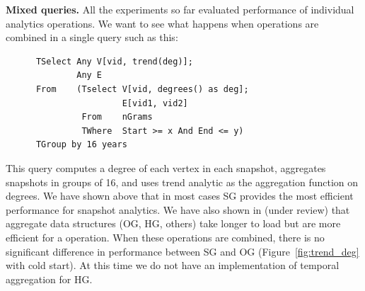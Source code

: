 
{\bf Mixed queries.} All the experiments so far evaluated performance
of individual \ql analytics operations.  We want to see what happens
when operations are combined in a single query such as this:

\begin{small}
\begin{verbatim}
      TSelect Any V[vid, trend(deg)];
              Any E
      From    (Tselect V[vid, degrees() as deg]; 
                       E[vid1, vid2]
               From    nGrams
               TWhere  Start >= x And End <= y)
      TGroup by 16 years
\end{verbatim}
\end{small}

This query computes a degree of each vertex in each snapshot,
aggregates snapshots in groups of 16, and uses trend analytic as the
aggregation function on degrees.  We have shown above that in most
cases SG provides the most efficient performance for snapshot
analytics.  We have also shown in (under review) that aggregate data
structures (OG, HG, others) take longer to load but are more efficient
for a  operation.  When these operations are combined,
there is no significant difference in performance between SG and OG
(Figure~\ref{fig:trend_deg} with cold start).  At this time we do not
have an implementation of temporal aggregation for HG.

